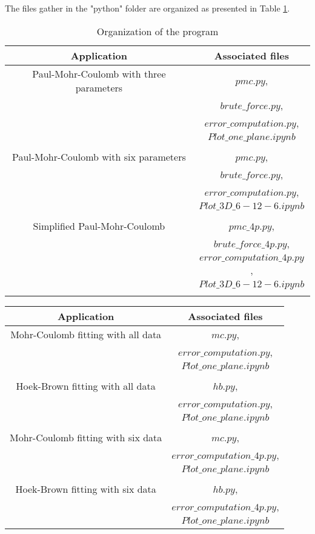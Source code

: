 The files gather in the "python" folder are organized as presented in Table \ref{tbC:files}.
\begin{table}[b!]
    \centering
    \caption{Organization of the program}
    \begin{tabular}{cc}
        \hline
        Application & Associated files\\
        \hline
        \hline
        Paul-Mohr-Coulomb with three parameters & $pmc.py$,\\
         & $brute\_force.py$, \\
         & $error\_computation.py$,\\
         & $Plot\_one\_plane.ipynb$\\
         \\
        Paul-Mohr-Coulomb with six parameters & $pmc.py$, \\
         & $brute\_force.py$, \\
         & $error\_computation.py$,\\
         & $Plot\_3D\_6-12-6.ipynb$\\
        \\
        Simplified Paul-Mohr-Coulomb & $pmc\_4p.py$,\\
        & $brute\_force\_4p.py$, \\
        & $error\_computation\_4p.py$,\\
        & $Plot\_3D\_6-12-6.ipynb$\\
       \\
    \end{tabular}
    \label{tbC:files}
\end{table}
\begin{table}
    \centering
    \begin{tabular}{cc}
        \hline
        Application & Associated files\\
        \hline
        \hline
        Mohr-Coulomb fitting with all data & $mc.py$, \\
         & $error\_computation.py$,\\
         & $Plot\_one\_plane.ipynb$\\
        \\
        Hoek-Brown fitting with all data & $hb.py$, \\
         & $error\_computation.py$,\\
         & $Plot\_one\_plane.ipynb$\\
        \\
        Mohr-Coulomb fitting with six data & $mc.py$, \\
         & $error\_computation\_4p.py$,\\
         & $Plot\_one\_plane.ipynb$\\
        \\
        Hoek-Brown fitting with six data & $hb.py$, \\
         & $error\_computation\_4p.py$,\\
         & $Plot\_one\_plane.ipynb$
    \end{tabular}
\end{table}


